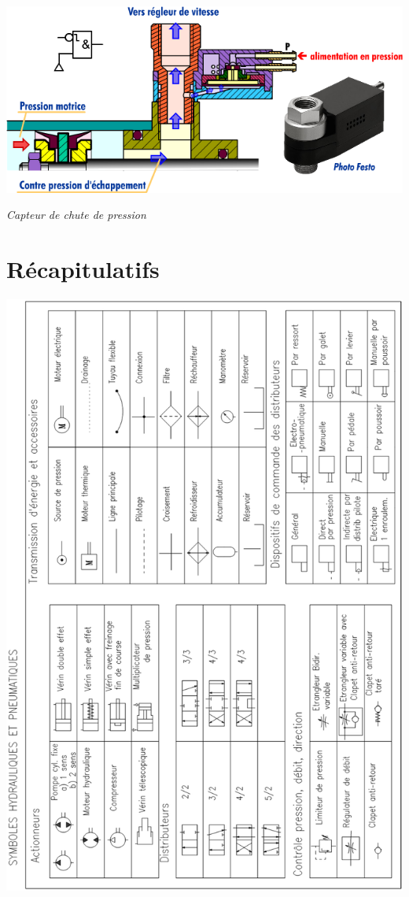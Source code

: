 \documentclass[10pt]{article}
\begin{document}
\begin{minipage}[c]{.35\linewidth}
\begin{center}
\includegraphics[width=\textwidth]{images/CapteurChute}

\textit{Capteur de chute de pression}
\end{center}
\end{minipage}

\section{Récapitulatifs}
\begin{center}
\includegraphics[width=.75\textwidth]{images/recap}
\end{center}
\end{document}
